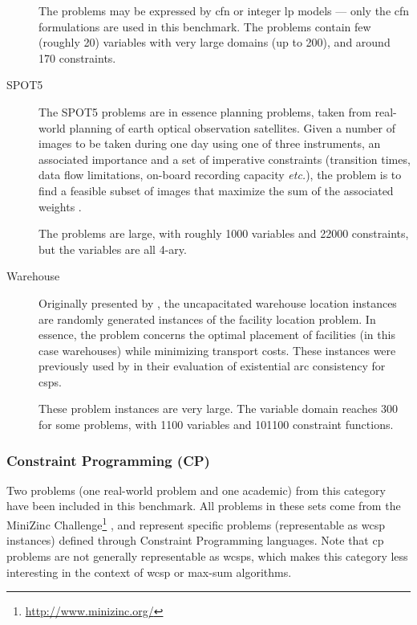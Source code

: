 \begin{description}
		The problems may be expressed by \gls{cfn} or integer \gls{lp} models — only the \gls{cfn} formulations are used in this benchmark. The problems contain few (roughly \num{20}) variables with very large domains (up to \num{200}), and around \num{170} constraints.

	\item[SPOT5]
		The SPOT5 problems are in essence planning problems, taken from real-world planning of earth optical observation satellites.
		Given a number of images to be taken during one day using one of three instruments, an associated importance and a set of imperative constraints (transition times, data flow limitations, on-board recording capacity \emph{etc.}), the problem is to find a feasible subset of images that maximize the sum of the associated weights \parencite{Bensana99}.

		The problems are large, with roughly \num{1000} variables and \num{22000} constraints, but the variables are all 4-ary.

	\item[Warehouse]
		Originally presented by \textcite{Kratica01}, the uncapacitated warehouse location instances are randomly generated instances of the facility location problem. In essence, the problem concerns the optimal placement of facilities (in this case warehouses) while minimizing transport costs. These instances were previously used by \textcite{deGivry05} in their evaluation of existential arc consistency for \glspl{csp}.

		These problem instances are very large. The variable domain reaches \num{300} for some problems, with \num{1100} variables and \num{101100} constraint functions.

\end{description}

\subsubsection{Constraint Programming (CP)}
Two problems (one real-world problem and one academic) from this category have been included in this benchmark.
All problems in these sets come from the MiniZinc Challenge\footnote{\url{http://www.minizinc.org/}} \parencite[\pno~5]{deGivry14}, and represent specific problems (representable as \gls{wcsp} instances) defined through Constraint Programming languages.
Note that \gls{cp} problems are not generally representable as \glspl{wcsp}, which makes this category less interesting in the context of \gls{wcsp} or max-sum algorithms.

